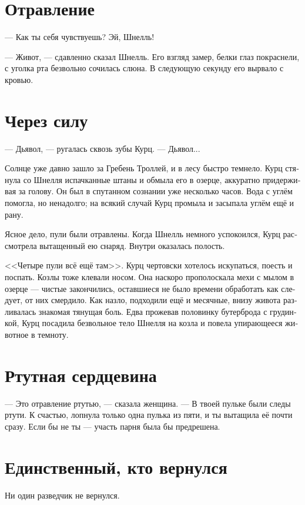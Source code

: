 \documentclass[a4paper,10pt,fleqn]{book}\usepackage{polyglossia}\setdefaultlanguage[babelshorthands=true]{russian}\setotherlanguage{english}\defaultfontfeatures{Ligatures=TeX,Mapping=tex-text}\usepackage{xcolor}\newcommand{\ml}[3]{#2}
\begin{document}
\section{Отравление}

--- Как ты себя чувствуешь?
Эй, Шнелль!

--- Живот, --- сдавленно сказал Шнелль.
Его взгляд замер, белки глаз покраснели, с уголка рта безвольно сочилась слюна.
В следующую секунду его вырвало с кровью.

\section{Через силу}

--- Дьявол, --- ругалась сквозь зубы Курц.
--- Дьявол...

Солнце уже давно зашло за Гребень Троллей, и в лесу быстро темнело.
Курц стянула со Шнелля испачканные штаны и обмыла его в озерце, аккуратно придерживая за голову.
Он был в спутанном сознании уже несколько часов.
Вода с углём помогла, но ненадолго;
на всякий случай Курц промыла и засыпала углём ещё и рану.

Ясное дело, пули были отравлены.
Когда Шнелль немного успокоился, Курц рассмотрела вытащенный ею снаряд.
Внутри оказалась полость.

<<Четыре пули всё ещё там>>.
Курц чертовски хотелось искупаться, поесть и поспать.
Козлы тоже клевали носом.
Она наскоро прополоскала мехи с мылом в озерце --- чистые закончились, оставшиеся не было времени обработать как следует, от них смердило.
Как назло, подходили ещё и месячные, внизу живота разливалась знакомая тянущая боль.
Едва прожевав половинку бутерброда с грудинкой, Курц посадила безвольное тело Шнелля на козла и повела упирающееся животное в темноту.

\section{Ртутная сердцевина}

--- Это отравление ртутью, --- сказала женщина.
--- В твоей пульке были следы ртути.
К счастью, лопнула только одна пулька из пяти, и ты вытащила её почти сразу.
Если бы не ты --- участь парня была бы предрешена.

\section{Единственный, кто вернулся}

Ни один разведчик не вернулся.
\end{document}
